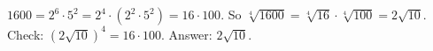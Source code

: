 $1600=2^6\cdot5^2=2^4\cdot(2^2\cdot5^2)=16\cdot100$. So $\sqrt[4]{1600}=\sqrt[4]{16}\cdot\sqrt[4]{100}=2\sqrt{10}$. Check: $(2\sqrt{10})^4=16\cdot100$. Answer: $\boxed{2\sqrt{10}}$.
